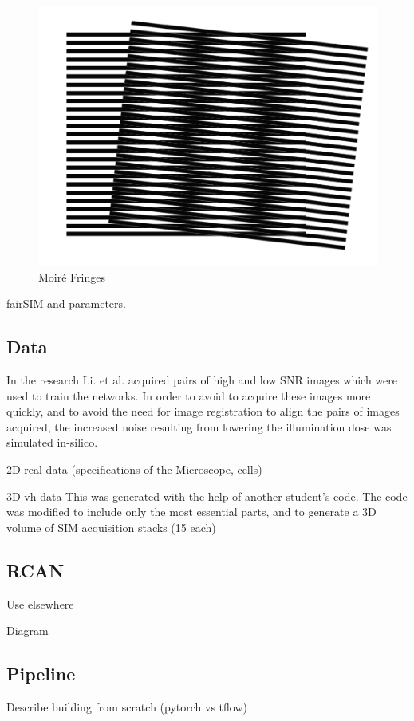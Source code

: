 \documentclass[12pt]{article}
\begin{document}
\begin{figure}[hbt]
    \includegraphics[scale=0.5]{figures/moire.png}
    \caption{Moir\'{e} Fringes}
    \label{plan2}
\end{figure}

fairSIM and parameters.

\subsection{Data}

In the research Li. et al. acquired pairs of high and low SNR images which were used to train the networks.
In order to avoid to acquire these images more quickly, and to avoid the need for image registration to align the pairs of images acquired,
the increased noise resulting from lowering the illumination dose was simulated in-silico.

2D real data (specifications of the Microscope, cells)

3D vh data
This was generated with the help of another student's code.
The code was modified to include only the most essential parts, and to generate a 3D volume of SIM acquisition stacks (15 each)

\subsection{RCAN}
Use elsewhere

Diagram

\subsection{Pipeline}
Describe building from scratch (pytorch vs tflow)
\end{document}
